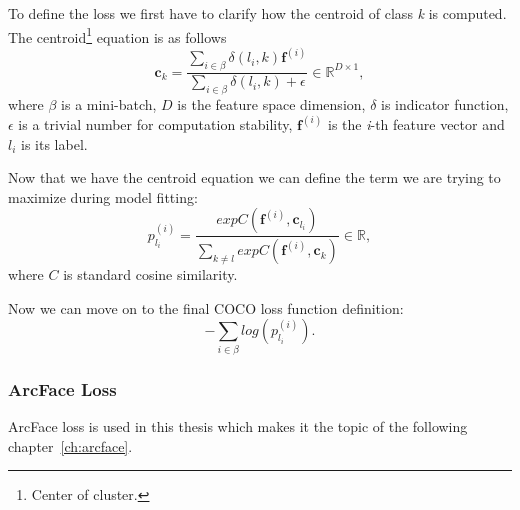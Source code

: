 To define the loss we first have to clarify how the centroid of class \textit{k} is computed.
The centroid\footnote{Center of cluster.} equation is as follows
\begin{equation}
    \boldsymbol{c}_{k} = \frac{\sum_{i \in \beta} \delta \left( l_i, k \right)\boldsymbol{f}^{(i)}}
    {\sum_{i \in \beta} \delta \left( l_i, k \right) + \epsilon} \in \mathbb{R}^{D \times 1},
\end{equation}
where $\beta$ is a mini-batch, $D$ is the feature space dimension, $\delta$ is indicator function, $\epsilon$ is a
trivial number for computation stability, $\boldsymbol{f}^{(i)}$ is the \textit{i}-th feature vector and $l_i$ is
its label.

Now that we have the centroid equation we can define the term we are trying to maximize during model fitting:
\begin{equation}
    p_{l_i}^{(i)} = \frac{exp C(\boldsymbol{f}^{(i)}, \boldsymbol{c}_{l_{i}})}
    {\sum_{k \neq l} exp C(\boldsymbol{f}^{(i)}, \boldsymbol{c}_{k})} \in \mathbb{R},
\end{equation}
where $C$ is standard cosine similarity.

Now we can move on to the final COCO loss function definition:
\begin{equation}
    - \sum_{i \in \beta} log \left( p_{l_i}^{(i)} \right).
\end{equation}


\subsubsection{ArcFace Loss}\label{subsubsec:arcface}
ArcFace loss is used in this thesis which makes it the topic of the following chapter~\ref{ch:arcface}.